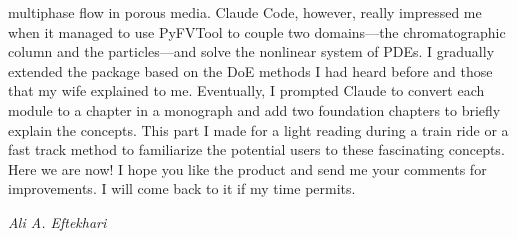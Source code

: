 multiphase flow in porous media. Claude Code, however, really impressed me when it
managed to use PyFVTool to couple two domains---the chromatographic column and the
particles---and solve the nonlinear system of PDEs. I gradually extended the
package based on the DoE methods I had heard before and those that my wife
explained to me. Eventually, I prompted Claude to convert each module to a chapter
in a monograph and add two foundation chapters to briefly explain the concepts.
This part I made for a light reading during a train ride or a fast track method to
familiarize the potential users to these fascinating concepts. Here we are now! I
hope you like the product and send me your comments for improvements. I will come
back to it if my time permits.

\bigskip
\noindent\hfill\emph{Ali A. Eftekhari}
